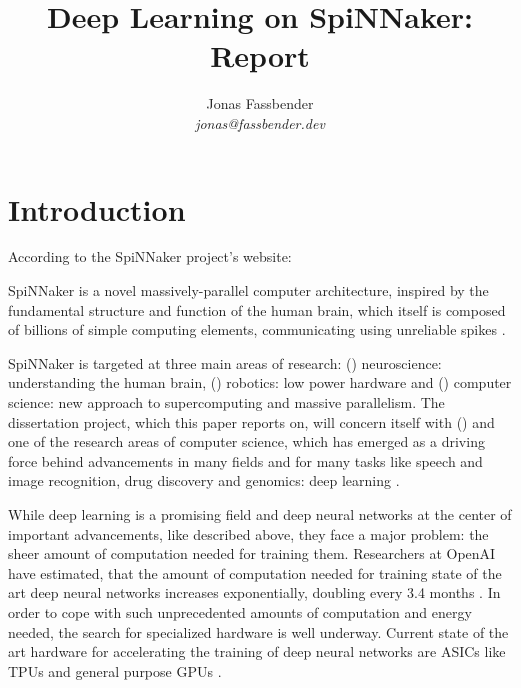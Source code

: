 \documentclass{article}
\begin{document}

\title{Deep Learning on SpiNNaker: Report}
\author{Jonas Fassbender \\ \textit{jonas@fassbender.dev}}
\date{}

\makeEPCCtitle

\newpage

\begin{abstract}
\end{abstract}

\newpage

\tableofcontents

\newpage


\section{Introduction} %

According to the SpiNNaker project's website:
\begin{displayquote}
  SpiNNaker is a novel massively-parallel computer
  architecture, inspired by the fundamental structure and
  function of the human brain, which itself is composed of
  billions of simple computing elements, communicating
  using unreliable spikes \citep{spinn_proj}.
\end{displayquote}
SpiNNaker is targeted at three main areas of research:
() neuroscience: understanding the human
brain, () robotics: low power hardware and
() computer science: new approach to
supercomputing and massive parallelism.
The dissertation project, which this paper reports on,
will concern itself with () and one of the
research areas of computer science, which has emerged as
a driving force behind advancements in many fields and for
many tasks like speech and image recognition, drug
discovery and genomics: deep learning
\citep{lecun_et_al_2015}.

While deep learning is a promising field and deep neural
networks at the center of important advancements, like
described above, they face a major problem: the sheer
amount of computation needed for training them.
Researchers at OpenAI have estimated, that the amount of
computation needed for training state of the art deep
neural networks increases exponentially, doubling every
3.4 months \citep{openai2019}.
In order to cope with such unprecedented amounts of
computation and energy needed, the search for specialized
hardware is well underway.
Current state of the art hardware for accelerating the
training of deep neural networks are ASICs like TPUs and
general purpose GPUs \citep{tpus, mittal_et_al_2019}.
\end{document}
